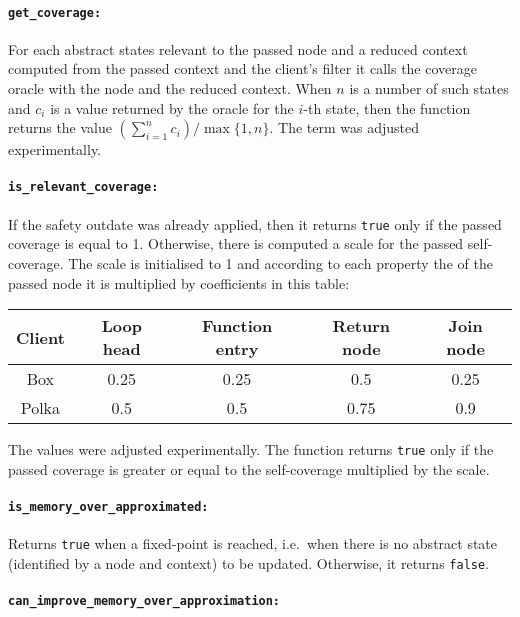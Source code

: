 \documentclass[envcountsame]{llncs}
\begin{document}
\paragraph{\tt get\_coverage: }

For each abstract states relevant to the passed node and a reduced context
computed from the passed context and the client's filter it calls the coverage
oracle with the node and the reduced context. When $ n $ is a number of such
states and $ c_i $ is a value returned by the oracle for the $ i $-th state,
then the function returns the value $ (\sum_{i=1}^{n} c_i) / \max\{ 1,n \} $.
The term was adjusted experimentally.

\paragraph{\tt is\_relevant\_coverage: }

If the safety outdate was already applied, then it returns \texttt{true} only if
the passed coverage is equal to 1. Otherwise, there is computed a scale for the
passed self-coverage.  The scale is initialised to 1 and according to each
property the of the passed node it is multiplied by coefficients in this table:

\hspace{5mm}
\begin{tabular}{c||c|c|c|c}
\textbf{Client} &
    \textbf{Loop head} &
    \textbf{Function entry} &
    \textbf{Return node} &
    \textbf{Join node}
    \\
\hline
Box & 0.25 & 0.25 & 0.5 & 0.25 \\
Polka & 0.5 & 0.5 & 0.75 & 0.9
\end{tabular}

\noindent The values were adjusted experimentally. The function returns
\texttt{true} only if the passed coverage is greater or equal to the
self-coverage multiplied by the scale.

\paragraph{\tt is\_memory\_over\_approximated: }

Returns \texttt{true} when a fixed-point is reached, i.e.~when there is no
abstract state (identified by a node and context) to be updated. Otherwise, it
returns \texttt{false}.

\paragraph{\tt can\_improve\_memory\_over\_approximation: }
\end{document}
